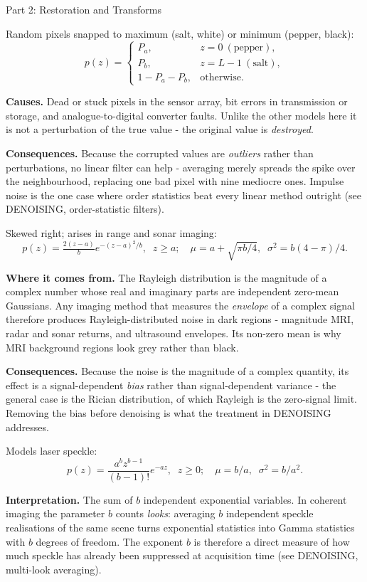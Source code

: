 \documentclass[letterpaper]{article}
\begin{document}
\begin{notes}{Part 2: Restoration and Transforms}

Random pixels snapped to maximum (salt, white) or minimum (pepper, black):
$$p(z) = \begin{cases}P_a, & z=0\ (\text{pepper}),\\ P_b, & z=L{-}1\ (\text{salt}),\\ 1{-}P_a{-}P_b, & \text{otherwise.}\end{cases}$$

\textbf{Causes.} Dead or stuck pixels in the sensor array, bit errors in transmission or storage, and analogue-to-digital converter faults. Unlike the other models here it is not a perturbation of the true value - the original value is \emph{destroyed}.

\textbf{Consequences.} Because the corrupted values are \emph{outliers} rather than perturbations, no linear filter can help - averaging merely spreads the spike over the neighbourhood, replacing one bad pixel with nine mediocre ones. Impulse noise is the one case where order statistics beat every linear method outright (see DENOISING, order-statistic filters).


Skewed right; arises in range and sonar imaging:
$$p(z)=\tfrac{2(z-a)}{b}e^{-(z-a)^2/b},\;\;z\ge a;\quad \mu=a+\sqrt{\pi b/4},\;\;\sigma^2=b(4{-}\pi)/4.$$

\textbf{Where it comes from.} The Rayleigh distribution is the magnitude of a complex number whose real and imaginary parts are independent zero-mean Gaussians. Any imaging method that measures the \emph{envelope} of a complex signal therefore produces Rayleigh-distributed noise in dark regions - magnitude MRI, radar and sonar returns, and ultrasound envelopes. Its non-zero mean is why MRI background regions look grey rather than black.

\textbf{Consequences.} Because the noise is the magnitude of a complex quantity, its effect is a signal-dependent \emph{bias} rather than signal-dependent variance - the general case is the Rician distribution, of which Rayleigh is the zero-signal limit. Removing the bias before denoising is what the treatment in DENOISING addresses.


Models laser speckle:
$$p(z)=\frac{a^b z^{b-1}}{(b-1)!}e^{-az},\;\;z\ge 0;\quad \mu=b/a,\;\;\sigma^2=b/a^2.$$

\textbf{Interpretation.} The sum of $b$ independent exponential variables. In coherent imaging the parameter $b$ counts \emph{looks}: averaging $b$ independent speckle realisations of the same scene turns exponential statistics into Gamma statistics with $b$ degrees of freedom. The exponent $b$ is therefore a direct measure of how much speckle has already been suppressed at acquisition time (see DENOISING, multi-look averaging).


\end{notes}
\end{document}
